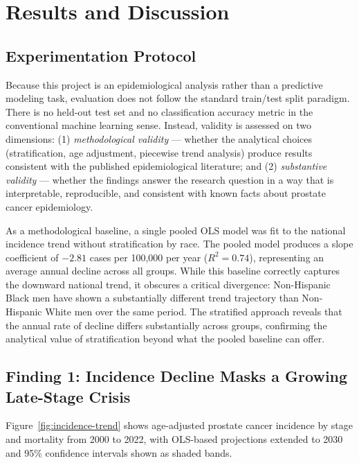 \section{Results and Discussion}

\subsection{Experimentation Protocol}

Because this project is an epidemiological analysis rather than a predictive
modeling task, evaluation does not follow the standard train/test split paradigm.
There is no held-out test set and no classification accuracy metric in the
conventional machine learning sense. Instead, validity is assessed on two
dimensions: (1) \textit{methodological validity} --- whether the analytical choices
(stratification, age adjustment, piecewise trend analysis) produce results consistent
with the published epidemiological literature; and (2) \textit{substantive validity}
--- whether the findings answer the research question in a way that is interpretable,
reproducible, and consistent with known facts about prostate cancer epidemiology.

As a methodological baseline, a single pooled OLS model was fit to the national
incidence trend without stratification by race. The pooled model produces a slope
coefficient of $-2.81$ cases per 100,000 per year ($R^2 = 0.74$), representing an
average annual decline across all groups. While this baseline correctly captures the
downward national trend, it obscures a critical divergence: Non-Hispanic Black men
have shown a substantially different trend trajectory than Non-Hispanic White men
over the same period. The stratified approach reveals that the annual rate of decline
differs substantially across groups, confirming the analytical value of stratification
beyond what the pooled baseline can offer.

\subsection{Finding 1: Incidence Decline Masks a Growing Late-Stage Crisis}

Figure~\ref{fig:incidence-trend} shows age-adjusted prostate cancer incidence by
stage and mortality from 2000 to 2022, with OLS-based projections extended to 2030
and 95\% confidence intervals shown as shaded bands.

